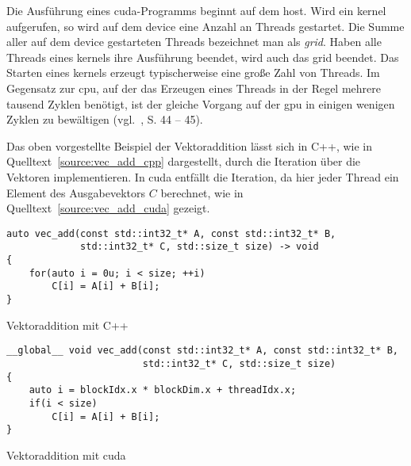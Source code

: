 Die Ausführung eines \gls{cuda}-Programms beginnt auf dem \gls{host}. Wird ein \gls{kernel} aufgerufen, so wird auf dem
\gls{device} eine Anzahl an Threads gestartet. Die Summe aller auf dem \gls{device} gestarteten Threads bezeichnet
man als \textit{\gls{grid}}. Haben alle Threads eines \gls{kernel}s ihre Ausführung beendet, wird auch das \gls{grid}
beendet. Das Starten eines \gls{kernel}s erzeugt typischerweise eine große Zahl von Threads. Im Gegensatz zur \gls{cpu},
auf der das Erzeugen eines Threads in der Regel mehrere tausend Zyklen benötigt, ist der gleiche Vorgang auf der
\gls{gpu} in einigen wenigen Zyklen zu bewältigen (vgl.~\cite{kirkhwu}, S. 44 -- 45).

Das oben vorgestellte Beispiel der Vektoraddition lässt sich in C++, wie in Quelltext~\ref{source:vec_add_cpp}
dargestellt, durch die Iteration über die Vektoren implementieren.  In \gls{cuda} entfällt die Iteration, da hier 
jeder Thread ein Element des Ausgabevektors $C$ berechnet, wie in Quelltext~\ref{source:vec_add_cuda} gezeigt.

\begin{listing}
\begin{verbatim}
auto vec_add(const std::int32_t* A, const std::int32_t* B,
             std::int32_t* C, std::size_t size) -> void
{
    for(auto i = 0u; i < size; ++i)
        C[i] = A[i] + B[i];
}
\end{verbatim}
\caption{Vektoraddition mit C++}
\label{source:vec_add_cpp}
\end{listing}

\begin{listing}
\begin{verbatim}
__global__ void vec_add(const std::int32_t* A, const std::int32_t* B,
                        std::int32_t* C, std::size_t size)
{
    auto i = blockIdx.x * blockDim.x + threadIdx.x;
    if(i < size)
        C[i] = A[i] + B[i];
}
\end{verbatim}
\caption{Vektoraddition mit \gls{cuda}}
\label{source:vec_add_cuda}
\end{listing}

